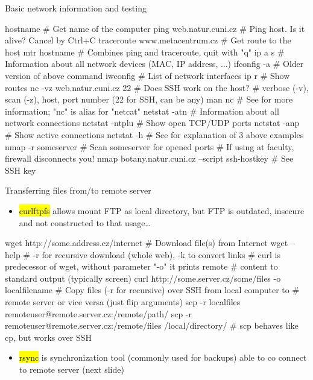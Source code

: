 \documentclass[compress, ucs, xelatex, 11pt, xcolor=svgnames,
  hyperref={
    bookmarks=true,
    unicode=true,
    colorlinks=true,
    pdftitle={Linux, command line and MetaCentrum},
    plainpages=false,
    pdfauthor={Vojtech Zeisek},
    pdfsubject={Course about use of Linux command line, writing shell scripts and using MetaCentrum of CESNET},
    pdfcreator={XeLaTeX},
    pdfkeywords={Linux, GNU, BASH, shell, command line, MetaCentrum},
    linkcolor=DarkRed,
    anchorcolor=DarkBlue,
    citecolor=Indigo,
    filecolor=NavyBlue,
    menucolor=DarkMagenta,
    urlcolor=DarkBlue,
    pdftex},
  url={hyphens, lowtilde} %
  ]{beamer}
\renewcommand{\texttt}[1]{\hl{\ttfamily #1}}
\begin{document}
\begin{frame}[fragile]{Basic network information and testing}
  \begin{bashcode}
    hostname # Get name of the computer
    ping web.natur.cuni.cz # Ping host. Is it alive? Cancel by Ctrl+C
    traceroute www.metacentrum.cz # Get route to the host
    mtr hostname # Combines ping and traceroute, quit with "q"
    ip a s # Information about all network devices (MAC, IP address, ...)
    ifconfig -a # Older version of above command
    iwconfig # List of network interfaces
    ip r # Show routes
    nc -vz web.natur.cuni.cz 22 # Does SSH work on the host?
      # verbose (-v), scan (-z), host, port number (22 for SSH, can be any)
    man nc # See for more information; "nc" is alias for "netcat"
    netstat -atn # Information about all network connections
    netstat -ntplu # Show open TCP/UDP ports
    netstat -anp # Show active connections
    netstat -h # See for explanation of 3 above examples
    nmap -r someserver # Scan someserver for opened ports
                       # If using at faculty, firewall disconnects you!
    nmap botany.natur.cuni.cz --script ssh-hostkey # See SSH key
  \end{bashcode}
\end{frame}

\begin{frame}[fragile]{Transferring files from/to remote server}
  \label{transfers}
  \begin{itemize}
    \item \texttt{curlftpfs} allows mount FTP as local directory, but FTP is outdated, insecure and not constructed to that usage\ldots
  \end{itemize}
  \begin{bashcode}
    wget http://some.address.cz/internet # Download file(s) from Internet
    wget --help # -r for recursive download (whole web), -k to convert links
    # curl is predecessor of wget, without parameter "-o" it prints remote
    # content to standard output (typically screen)
    curl http://some.server.cz/some/files -o localfilename
    # Copy files (-r for recursive) over SSH from local computer to
    # remote server or vice versa (just flip arguments)
    scp -r localfiles remoteuser@remote.server.cz:/remote/path/
    scp -r remoteuser@remote.server.cz:/remote/files /local/directory/
    # scp behaves like cp, but works over SSH
  \end{bashcode}
  \begin{itemize}
    \item \texttt{rsync} is synchronization tool (commonly used for backups) able to co connect to remote server (next slide)
  \end{itemize}
\end{frame}
\end{document}
